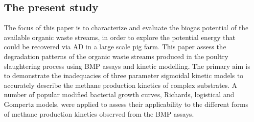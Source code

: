 \subsection{The present study}
The focus of this paper is to characterize and evaluate the biogas potential of the available organic waste streams, in order to explore the potential energy that could be recovered via AD in a large scale pig farm. This paper assess the degradation patterns of the organic waste streams produced in the poultry slaughtering process using BMP assays and kinetic modelling. The primary aim is to demonstrate the inadequacies of three parameter sigmoidal kinetic models to accurately describe the methane production kinetics of complex substrates. A number of popular modified bacterial growth curves, Richards, logistical and Gompertz models, were applied to assess their applicability to the different forms of methane production kinetics observed from the BMP assays.